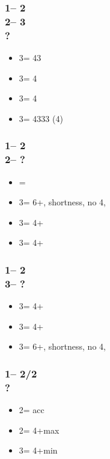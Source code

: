\subsubsection*{1\nt -- 2\clubs\\
                2\major -- 3\clubs\\
                ?}
\begin{itemize}
    \item 3\diams = 43\minor
    \item 3\hearts = 4\clubs
    \item 3\spades = 4\diams
    \item 3\nt = 4333 (4\major)
\end{itemize}

\subsubsection*{1\nt -- 2\clubs\\
                2\nt -- ?}
\begin{itemize}
    \item \pass = \inv\ \bal
    \item 3\clubs = 6+\diams, \clubs shortness, no 4\major, \gf
    \item 3\diams = 4+\hearts
    \item 3\hearts = 4+\spades
\end{itemize}

\subsubsection*{1\nt -- 2\clubs\\
                3\clubs -- ?}
\begin{itemize}
    \item 3\diams = 4+\hearts
    \item 3\hearts = 4+\spades
    \item 3\spades = 6+\diams, \clubs shortness, no 4\major, \gf
\end{itemize}

\subsubsection*{1\nt -- 2\diams/2\hearts\\
                ?}
\begin{itemize}
    \item 2\major = acc
    \item 2\nt = 4+\major max
    \item 3\major = 4+\major min
\end{itemize}

